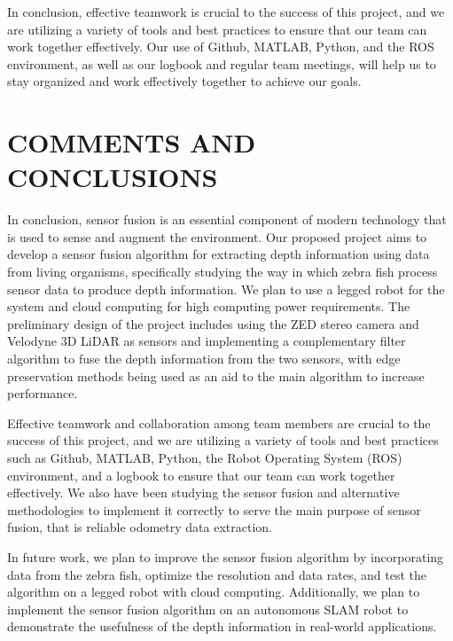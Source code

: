 \documentclass[12pt]{article}
\begin{document}
In conclusion, effective teamwork is crucial to the success of this project, and we are utilizing a variety of tools and best practices to ensure that our team can work together effectively. Our use of Github, MATLAB, Python, and the ROS environment, as well as our logbook and regular team meetings, will help us to stay organized and work effectively together to achieve our goals.

\section{COMMENTS AND CONCLUSIONS}

In conclusion, sensor fusion is an essential component of modern technology that is used to sense and augment the environment. Our proposed project aims to develop a sensor fusion algorithm for extracting depth information using data from living organisms, specifically studying the way in which zebra fish process sensor data to produce depth information. We plan to use a legged robot for the system and cloud computing for high computing power requirements. The preliminary design of the project includes using the ZED stereo camera and Velodyne 3D LiDAR as sensors and implementing a complementary filter algorithm to fuse the depth information from the two sensors, with edge preservation methods being used as an aid to the main algorithm to increase performance.

Effective teamwork and collaboration among team members are crucial to the success of this project, and we are utilizing a variety of tools and best practices such as Github, MATLAB, Python, the Robot Operating System (ROS) environment, and a logbook to ensure that our team can work together effectively. We also have been studying the sensor fusion and alternative methodologies to implement it correctly to serve the main purpose of sensor fusion, that is reliable odometry data extraction.

In future work, we plan to improve the sensor fusion algorithm by incorporating data from the zebra fish, optimize the resolution and data rates, and test the algorithm on a legged robot with cloud computing. Additionally, we plan to implement the sensor fusion algorithm on an autonomous SLAM robot to demonstrate the usefulness of the depth information in real-world applications.
\end{document}

